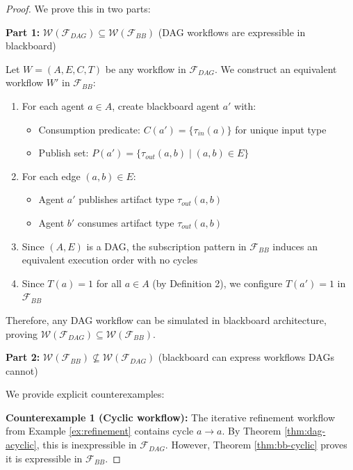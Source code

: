 \documentclass[11pt]{article}
\begin{document}
\begin{proof}
We prove this in two parts:

\textbf{Part 1: } $\mathcal{W}(\mathcal{F}_{DAG}) \subseteq \mathcal{W}(\mathcal{F}_{BB})$ (DAG workflows are expressible in blackboard)

Let $W = (A, E, C, T)$ be any workflow in $\mathcal{F}_{DAG}$. We construct an equivalent workflow $W'$ in $\mathcal{F}_{BB}$:

\begin{enumerate}
    \item For each agent $a \in A$, create blackboard agent $a'$ with:
    \begin{itemize}
        \item Consumption predicate: $C(a') = \{\tau_{in}(a)\}$ for unique input type
        \item Publish set: $P(a') = \{\tau_{out}(a, b) \mid (a, b) \in E\}$
    \end{itemize}

    \item For each edge $(a, b) \in E$:
    \begin{itemize}
        \item Agent $a'$ publishes artifact type $\tau_{out}(a, b)$
        \item Agent $b'$ consumes artifact type $\tau_{out}(a, b)$
    \end{itemize}

    \item Since $(A, E)$ is a DAG, the subscription pattern in $\mathcal{F}_{BB}$ induces an equivalent execution order with no cycles

    \item Since $T(a) = 1$ for all $a \in A$ (by Definition 2), we configure $T(a') = 1$ in $\mathcal{F}_{BB}$
\end{enumerate}

Therefore, any DAG workflow can be simulated in blackboard architecture, proving $\mathcal{W}(\mathcal{F}_{DAG}) \subseteq \mathcal{W}(\mathcal{F}_{BB})$.

\textbf{Part 2: } $\mathcal{W}(\mathcal{F}_{BB}) \not\subseteq \mathcal{W}(\mathcal{F}_{DAG})$ (blackboard can express workflows DAGs cannot)

We provide explicit counterexamples:

\textbf{Counterexample 1 (Cyclic workflow):} The iterative refinement workflow from Example \ref{ex:refinement} contains cycle $a \rightarrow a$. By Theorem \ref{thm:dag-acyclic}, this is inexpressible in $\mathcal{F}_{DAG}$. However, Theorem \ref{thm:bb-cyclic} proves it is expressible in $\mathcal{F}_{BB}$.


\end{proof}
\end{document}
